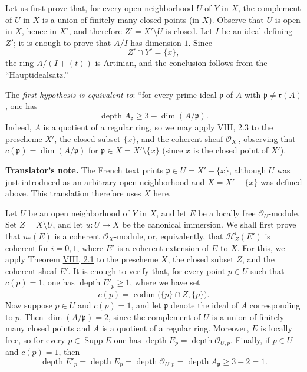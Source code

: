 Let us first prove that, for every open neighborhood $U$ of $Y$ in $X$, the
complement of $U$ in $X$ is a union of finitely many closed points (in $X$).
Observe that $U$ is open in $X$, hence in $X'$, and therefore
$Z'=X'\setminus U$ is closed. Let $I$ be an ideal defining $Z'$; it is
enough to prove that $A/I$ has dimension $1$. Since
\[
  Z'\cap Y'=\{x\},
\]
the ring $A/(I+(t))$ is Artinian, and the conclusion follows from the
``Hauptidealsatz.''

The \emph{first hypothesis is equivalent to}: ``for every prime ideal
$\mathfrak p$ of $A$ with $\mathfrak p\ne\mathfrak r(A)$, one has
\[
  \operatorname{depth} A_{\mathfrak p}
  \geq 3-\dim(A/\mathfrak p).
\]
Indeed, $A$ is a quotient of a regular ring, so we may apply \hyperref[VIII.2.3]{VIII, 2.3} to
the prescheme $X'$, the closed subset $\{x\}$, and the coherent sheaf
$\mathcal O_{X'}$, observing that
$c(\mathfrak p)=\dim(A/\mathfrak p)$ for
$\mathfrak p\in X=X'\setminus\{x\}$ (since $x$ is the closed point of
$X'$).

\medskip
\noindent\colorbox{noteblue}{\parbox{0.95\linewidth}{\footnotesize
\textbf{Translator's note.}
The French text prints $\mathfrak p\in U=X'-\{x\}$, although $U$ was
just introduced as an arbitrary open neighborhood and $X=X'-\{x\}$ was
defined above. This translation therefore uses $X$ here.}}

Let $U$ be an open neighborhood of $Y$ in $X$, and let $E$ be a locally
free $\mathcal O_U$-module. Set $Z=X\setminus U$, and let
$u\colon U\to X$ be the canonical immersion. We shall first prove that
$u_*(E)$ is a coherent $\mathcal O_X$-module, or, equivalently, that
$\mathcal H^i_Z(E')$ is coherent for $i=0,1$, where $E'$ is a coherent
extension of $E$ to $X$. For this, we apply Theorem \hyperref[VIII.2.1]{VIII, 2.1} to the
prescheme $X$, the closed subset $Z$, and the coherent sheaf $E'$. It is
enough to verify that, for every point $p\in U$ such that $c(p)=1$, one has
$\operatorname{depth}E'_p\geq1$, where we have set
\[
  c(p)=\operatorname{codim}
  \bigl(\overline{\{p\}}\cap Z,\overline{\{p\}}\bigr).
\]
Now suppose $p\in U$ and $c(p)=1$, and let $\mathfrak p$ denote the ideal
of $A$ corresponding to $p$. Then $\dim(A/\mathfrak p)=2$, since the
complement of $U$ is a union of finitely many closed points and $A$ is a
quotient of a regular ring. Moreover, $E$ is locally free, so for every
$p\in\operatorname{Supp}E$ one has
$\operatorname{depth}E_p=\operatorname{depth}\mathcal O_{U,p}$. Finally,
if $p\in U$ and $c(p)=1$, then
\[
  \operatorname{depth}E'_p
  =\operatorname{depth}E_p
  =\operatorname{depth}\mathcal O_{U,p}
  =\operatorname{depth}A_{\mathfrak p}
  \geq3-2=1.
\]

